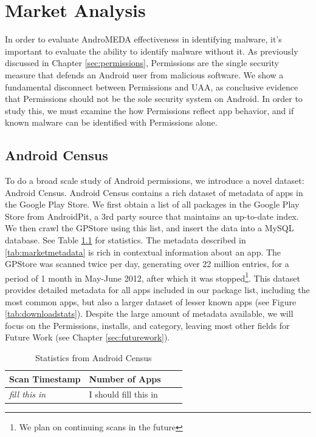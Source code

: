 \chapter{Market Analysis}
\label{sec:market}

In order to evaluate AndroMEDA effectiveness in identifying malware, it's important to evaluate the ability to identify malware without it. As previously discussed in Chapter \ref{sec:permissions}, Permissions are the single security measure that defends an Android user from malicious software. We show a fundamental disconnect between Permissions and UAA, as conclusive evidence that Permissions should not be the sole security system on Android. In order to study this, we must examine the how Permissions reflect app behavior, and if known malware can be identified with Permissions alone.








\section{Android Census}
To do a broad scale study of Android permissions, we introduce a novel dataset: Android Census\citep{androidcensus}. Android Census contains a rich dataset of metadata of apps in the Google Play Store. We first obtain a list of all packages in the Google Play Store from AndroidPit\citep{androidpit}, a 3rd party source that maintains an up-to-date index. We then crawl the GPStore using this list, and insert the data into a MySQL database. See Table \ref{tab:marketstats} for statistics. The metadata described in \ref{tab:marketmetadata} is rich in contextual information about an app. The GPStore was scanned twice per day, generating over 22 million entries, for a period of 1 month in May-June 2012, after which it was stopped\footnote{We plan on continuing scans in the future}. This dataset provides detailed metadata for all apps included in our package list, including the most common apps, but also a larger dataset of lesser known apps (see Figure \ref{tab:downloadstats}). Despite the large amount of metadata available, we will focus on the Permissions, installs, and category, leaving most other fields for Future Work (see Chapter \ref{sec:futurework}).


\begin{table}[h]
\begin{small}
\begin{tabular}{l|lll}
Scan Timestamp & Number of Apps &  \\
\hline

\textit{fill this in} & I should fill this in  \\

\end{tabular}
\end{small}
\caption{Statistics from Android Census}
\label{tab:marketstats}
\end{table}


